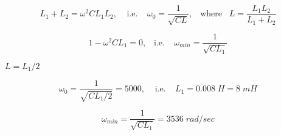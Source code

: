 {\newpage\clearpage
{}%
\begin{displaymath}	L_1+L_2=\omega^2CL_1L_2,\;\;\;\;\mbox{i.e.}\;\;\;\;
  	\omega_0=\frac{1}{\sqrt{CL}},\;\;\;\mbox{where}\;\;\;
  	L=\frac{L_1L_2}{L_1+L_2}
  \end{displaymath}%
\lthtmldisplayZ
\lthtmlcheckvsize\clearpage}

{\newpage\clearpage
{}%
\begin{displaymath}	1-\omega^2CL_1=0, \;\;\;\mbox{i.e.}\;\;\;\;
  	\omega_{min}=\frac{1}{\sqrt{CL_1}}	\end{displaymath}%
\lthtmldisplayZ
\lthtmlcheckvsize\clearpage}

{\newpage\clearpage
{}%
$L=L_1/2$%
\lthtmlinlinemathZ
\lthtmlcheckvsize\clearpage}

{\newpage\clearpage
{}%
\begin{displaymath} \omega_0=\frac{1}{\sqrt{CL_1/2}}=5000,\;\;\;\;\mbox{i.e.}\;\;\;\;
  	L_1=0.008\;H=8\;mH	\end{displaymath}%
\lthtmldisplayZ
\lthtmlcheckvsize\clearpage}

{\newpage\clearpage
{}%
\begin{displaymath} \omega_{min}=\frac{1}{\sqrt{CL_1}}=3536\;rad/sec	\end{displaymath}%
\lthtmldisplayZ
\lthtmlcheckvsize\clearpage}



